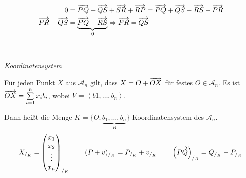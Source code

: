 \begin{mysatz}
\begin{enumerate}
\begin{minipage}{0.3\textwidth}
\begin{center}
                \end{center}
            \end{minipage}
            \begin{minipage}{0.4\textwidth}
                \begin{align*}
                    0 & = \overrightarrow{PQ} + \overrightarrow{QS} + \overrightarrow{SR} + \overrightarrow{RP} = \overrightarrow{PQ} + \overrightarrow{QS} - \overrightarrow{RS} - \overrightarrow{PR}\\
                    \overrightarrow{PR} - \overrightarrow{QS} & = \underbrace{\overrightarrow{PQ} - \overrightarrow{RS}}_{0} \Rightarrow \overrightarrow{PR} = \overrightarrow{QS}\\
                \end{align*}
            \end{minipage}\ \\
    \end{enumerate}
\end{mysatz}

\begin{mydef}\textit{Koordinatensystem}

    Für jeden Punkt $X$ aus $\mathcal{A}_n$ gilt, dass $X = O + \overrightarrow{OX}$ für festes $O \in \mathcal{A}_n$.
    Es ist $\overrightarrow{OX} = \sum\limits_{i=1}^{n} x_i b_i$, wobei $V = \left\langle b1, \ldots, b_n \right\rangle$.

    Dann heißt die Menge $K = \{ O; \underbrace{b_1, \ldots, b_n}_{B} \}$ Koordinatensystem des $\mathcal{A}_n$.
    \begin{align*}
        X_{/_K} =
        \begin{pmatrix}
            x_1\\ x_2\\ \vdots\\ x_n
        \end{pmatrix}_{/_K}
        \qquad
        (P + v)_{/_K} = P_{/_K} + v_{/_K}
        \qquad
        \left( \overrightarrow{PQ} \right)_{/_B} = Q_{/_K} - P_{/_K}
    \end{align*}
\end{mydef}

